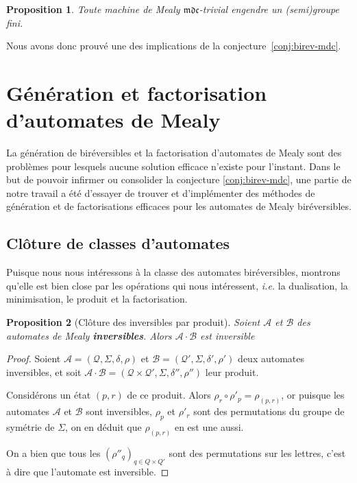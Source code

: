 \documentclass[11pt,a4paper]{article}
\newtheorem{prop}{Proposition}
\begin{document}
\begin{prop}
  Toute machine de Mealy $\mathfrak{mdc}$-trivial engendre un (semi)groupe fini.
\end{prop}

Nous avons donc prouvé une des implications de la conjecture~\ref{conj:birev-mdc}.

\section{Génération et factorisation d'automates de Mealy}
La génération de biréversibles et la factorisation d'automates de Mealy sont des problèmes pour lesquels aucune solution efficace n'existe pour l'instant. Dans le but de pouvoir infirmer ou consolider la conjecture \ref{conj:birev-mdc}, une partie de notre travail a été d'essayer de trouver et d'implémenter des méthodes de génération et de factorisations efficaces pour les automates de Mealy biréversibles.


\subsection{Clôture de classes d'automates\label{sec:cloture}}

Puisque nous nous intéressons à la classe des automates biréversibles, montrons qu'elle est bien close par les opérations qui nous intéressent, \emph{i.e.} la dualisation, la minimisation, le produit et la factorisation.

\begin{prop}[Clôture des inversibles par produit]
  Soient $\mathcal{A}$ et $\mathcal{B}$ des automates de Mealy \textbf{inversibles}. Alors $\mathcal{A}\cdot\mathcal{B}$ est inversible
\end{prop}

\begin{proof}
  Soient $\mathcal{A}=\left(\mathcal{Q}, \Sigma, \delta, \rho\right)$ et $\mathcal{B}=\left(\mathcal{Q'}, \Sigma, \delta', \rho'\right)$ deux automates inversibles, et soit $\mathcal{A\cdot B}=\left(\mathcal{Q\times Q'}, \Sigma, \delta'', \rho''\right)$ leur produit.


  Considérons un état $(p, r)$ de ce produit. Alors $\rho_r\circ\rho'_p=\rho_{(p,r)}$, or puisque les automates $\mathcal{A}$ et $\mathcal{B}$ sont inversibles, $\rho_p$ et $\rho'_r$ sont des permutations du groupe de symétrie de $\Sigma$, on en déduit que $\rho_{(p, r)}$ en est une aussi.

  On a bien que tous les ${(\rho''_q)}_{q\in Q\times Q'}$ sont des permutations sur les lettres, c'est à dire que l'automate est inversible.
\end{proof}
\end{document}
